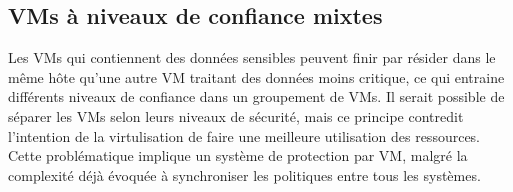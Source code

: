 

\subsection*{VMs à niveaux de confiance mixtes}

Les VMs qui contiennent des données sensibles peuvent finir par résider dans le même hôte qu'une autre VM traitant des données moins critique, ce qui entraine différents niveaux de confiance dans un groupement de VMs. Il serait possible de séparer les VMs selon leurs niveaux de sécurité, mais ce principe contredit l'intention de la virtulisation de faire une meilleure utilisation des ressources. Cette problématique implique un système de protection par VM, malgré la complexité déjà évoquée à synchroniser les politiques entre tous les systèmes.

